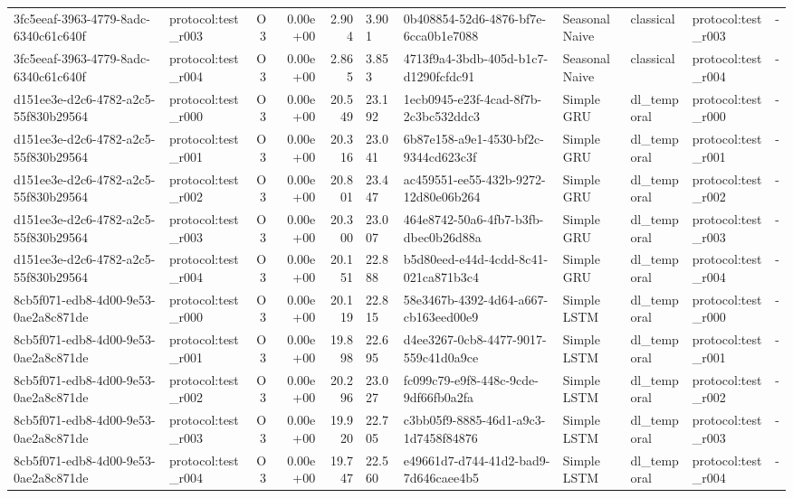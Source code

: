 \begin{table}[htbp]
\begin{tabular}{llrrr}
3fc5eeaf-3963-4779-8adc-6340c61c640f & protocol:test\_r003 & O3 & 0.00e+00 & 2.904 & 3.901 & 0b408854-52d6-4876-bf7e-6cca0b1e7088 & SeasonalNaive & classical & protocol:test\_r003 & - \\
3fc5eeaf-3963-4779-8adc-6340c61c640f & protocol:test\_r004 & O3 & 0.00e+00 & 2.865 & 3.853 & 4713f9a4-3bdb-405d-b1c7-d1290fcfdc91 & SeasonalNaive & classical & protocol:test\_r004 & - \\
d151ee3e-d2c6-4782-a2c5-55f830b29564 & protocol:test\_r000 & O3 & 0.00e+00 & 20.549 & 23.192 & 1ecb0945-e23f-4cad-8f7b-2c3bc532ddc3 & Simple GRU & dl\_temporal & protocol:test\_r000 & - \\
d151ee3e-d2c6-4782-a2c5-55f830b29564 & protocol:test\_r001 & O3 & 0.00e+00 & 20.316 & 23.041 & 6b87e158-a9e1-4530-bf2c-9344cd623c3f & Simple GRU & dl\_temporal & protocol:test\_r001 & - \\
d151ee3e-d2c6-4782-a2c5-55f830b29564 & protocol:test\_r002 & O3 & 0.00e+00 & 20.801 & 23.447 & ac459551-ee55-432b-9272-12d80e06b264 & Simple GRU & dl\_temporal & protocol:test\_r002 & - \\
d151ee3e-d2c6-4782-a2c5-55f830b29564 & protocol:test\_r003 & O3 & 0.00e+00 & 20.300 & 23.007 & 464e8742-50a6-4fb7-b3fb-dbec0b26d88a & Simple GRU & dl\_temporal & protocol:test\_r003 & - \\
d151ee3e-d2c6-4782-a2c5-55f830b29564 & protocol:test\_r004 & O3 & 0.00e+00 & 20.151 & 22.888 & b5d80eed-e44d-4cdd-8c41-021ca871b3c4 & Simple GRU & dl\_temporal & protocol:test\_r004 & - \\
8cb5f071-edb8-4d00-9e53-0ae2a8c871de & protocol:test\_r000 & O3 & 0.00e+00 & 20.119 & 22.815 & 58e3467b-4392-4d64-a667-cb163eed00e9 & Simple LSTM & dl\_temporal & protocol:test\_r000 & - \\
8cb5f071-edb8-4d00-9e53-0ae2a8c871de & protocol:test\_r001 & O3 & 0.00e+00 & 19.898 & 22.695 & d4ee3267-0cb8-4477-9017-559c41d0a9ce & Simple LSTM & dl\_temporal & protocol:test\_r001 & - \\
8cb5f071-edb8-4d00-9e53-0ae2a8c871de & protocol:test\_r002 & O3 & 0.00e+00 & 20.296 & 23.027 & fc099c79-e9f8-448c-9cde-9df66fb0a2fa & Simple LSTM & dl\_temporal & protocol:test\_r002 & - \\
8cb5f071-edb8-4d00-9e53-0ae2a8c871de & protocol:test\_r003 & O3 & 0.00e+00 & 19.920 & 22.705 & c3bb05f9-8885-46d1-a9c3-1d7458f84876 & Simple LSTM & dl\_temporal & protocol:test\_r003 & - \\
8cb5f071-edb8-4d00-9e53-0ae2a8c871de & protocol:test\_r004 & O3 & 0.00e+00 & 19.747 & 22.560 & e49661d7-d744-41d2-bad9-7d646caee4b5 & Simple LSTM & dl\_temporal & protocol:test\_r004 & - \\

\end{tabular}
\end{table}
